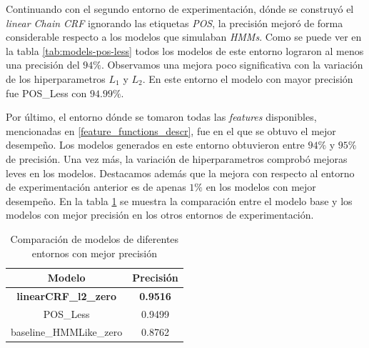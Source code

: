 \documentclass[letterpaper,12pt,oneside]{book}
\theoremstyle{definition}
\begin{document}
Continuando con el segundo entorno de experimentación, dónde se construyó el \textit{linear Chain CRF} ignorando las etiquetas \textit{POS}, la precisión mejoró de forma considerable respecto a los modelos que simulaban \textit{HMMs}. Como se puede ver en la tabla \ref{tab:models-pos-less} todos los modelos de este entorno lograron al menos una precisión del $94\%$. Observamos una mejora poco significativa con la variación de los hiperparametros $L_1$ y $L_2$. En este entorno el modelo con mayor precisión fue \textsf{POS\_Less} con $94.99\%$. 

Por último, el entorno dónde se tomaron todas las \textit{features} disponibles, mencionadas en \ref{feature_functions_descr}, fue en el que se obtuvo el mejor desempeño. Los modelos generados en este entorno obtuvieron entre $94\%$ y $95\%$ de precisión. Una vez más, la variación de hiperparametros comprobó mejoras leves en los modelos. Destacamos además que la mejora con respecto al entorno de experimentación anterior es de apenas $1\%$ en los modelos con mejor desempeño. En la tabla \ref{tab:models-comparation} se muestra la comparación entre el modelo base y los modelos con mejor precisión en los otros entornos de experimentación.

\begin{table}[ht]
    \centering
    \begin{tabular}{| c | c |}\hline
        \textbf{Modelo} & \textbf{Precisión} \\\hline
        \textbf{\textsf{linearCRF\_l2\_zero}} & \textbf{0.9516}\\ 
        \textsf{POS\_Less} & 0.9499\\ 
        \textsf{baseline\_HMMLike\_zero} & 0.8762\\ \hline
    \end{tabular}
    \caption{Comparación de modelos de diferentes entornos con mejor precisión}
    \label{tab:models-comparation}
\end{table}  
\end{document}
